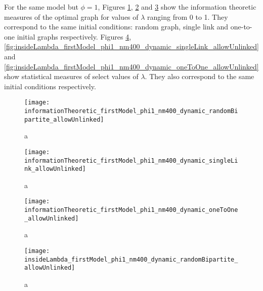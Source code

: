 

For the same model but $\phi=1$, Figures  \ref{fig:informationTheoretic_firstModel_phi1_nm400_dynamic_randomBipartite_allowUnlinked},  \ref{fig:informationTheoretic_firstModel_phi1_nm400_dynamic_singleLink_allowUnlinked} and  \ref{fig:informationTheoretic_firstModel_phi1_nm400_dynamic_oneToOne_allowUnlinked} show the information theoretic measures of the optimal graph for values of $\lambda$ ranging from 0 to 1.
They correspond to the same initial conditions: random graph, single link and one-to-one initial graphs respectively.
Figures \ref{fig:insideLambda_firstModel_phi1_nm400_dynamic_randomBipartite_allowUnlinked},  \ref{fig:insideLambda_firstModel_phi1_nm400_dynamic_singleLink_allowUnlinked} and  \ref{fig:insideLambda_firstModel_phi1_nm400_dynamic_oneToOne_allowUnlinked} show statistical measures of select values of $\lambda$.
They also correspond to the same initial conditions respectively.

\begin{figure}
  \centering
  \texttt{[image: informationTheoretic\_firstModel\_phi1\_nm400\_dynamic\_randomBipartite\_allowUnlinked]}
  \caption{a}
  \label{fig:informationTheoretic_firstModel_phi1_nm400_dynamic_randomBipartite_allowUnlinked}
\end{figure}

\begin{figure}
  \centering
  \texttt{[image: informationTheoretic\_firstModel\_phi1\_nm400\_dynamic\_singleLink\_allowUnlinked]}
  \caption{a}
  \label{fig:informationTheoretic_firstModel_phi1_nm400_dynamic_singleLink_allowUnlinked}
\end{figure}

\begin{figure}
  \centering
  \texttt{[image: informationTheoretic\_firstModel\_phi1\_nm400\_dynamic\_oneToOne\_allowUnlinked]}
  \caption{a}
  \label{fig:informationTheoretic_firstModel_phi1_nm400_dynamic_oneToOne_allowUnlinked}
\end{figure}

\begin{figure}
  \centering
  \texttt{[image: insideLambda\_firstModel\_phi1\_nm400\_dynamic\_randomBipartite\_allowUnlinked]}
  \caption{a}
  \label{fig:insideLambda_firstModel_phi1_nm400_dynamic_randomBipartite_allowUnlinked}
\end{figure}

